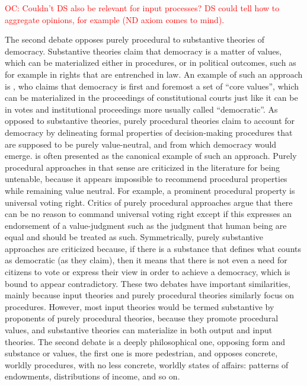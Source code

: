 \documentclass[preprint,11pt]{elsarticle}
\newcommand{\commentOC}[1]{\textcolor{red}{OC: #1}}
\begin{document}
\commentOC{Couldn’t DS also be relevant for
input processes? DS could tell how to aggregate opinions,
for example (ND axiom comes to mind).}

The second debate opposes purely procedural to substantive theories of democracy. Substantive theories claim that democracy is a matter of values, which can be materialized either in procedures, or in political outcomes, such as for example in rights that are entrenched in law. An example of such an approach is \cite{brettschneider_value_2006}, who claims that democracy is first and foremost a set of “core values”, which can be materialized in the proceedings of constitutional courts just like it can be in votes and institutional proceedings more usually called “democratic”. As opposed to substantive theories, purely procedural theories claim to account for democracy by delineating formal properties of decision-making procedures that are supposed to be purely value-neutral, and from which democracy would emerge. \cite{habermas_faktizitat_1992} is often presented as the canonical example of such an approach. Purely procedural approaches in that sense are criticized in the literature for being untenable, because it appears impossible to recommend procedural properties while remaining value neutral. For example, a prominent procedural property is universal voting right. Critics of purely procedural approaches argue that there can be no reason to command universal voting right except if this expresses an endorsement of a value-judgment such as the judgment that human being are equal and should be treated as such. Symmetrically, purely substantive approaches are criticized because, if there is a substance that defines what counts as democratic (as they claim), then it means that there is not even a need for citizens to vote or express their view in order to achieve a democracy, which is bound to appear contradictory.
These two debates have important similarities, mainly because input theories and purely procedural theories similarly focus on procedures. However, most input theories would be termed substantive by proponents of purely procedural theories, because they promote procedural values, and substantive theories can materialize in both output and input theories. The second debate is a deeply philosophical one, opposing form and substance or values, the first one is more pedestrian, and opposes concrete, worldly procedures, with no less concrete, worldly states of affairs: patterns of endowments, distributions of income, and so on.
\end{document}
